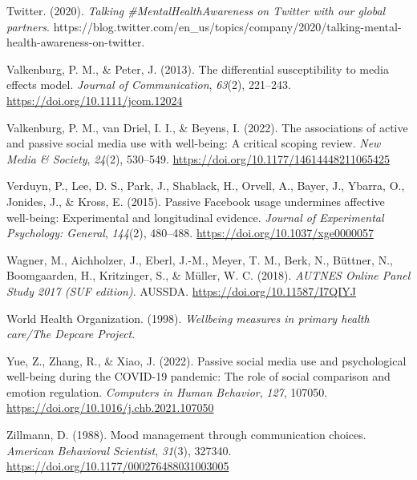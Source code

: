 \documentclass[
  man,mask,floatsintext]{apa7}
\newlength{\cslhangindent}
\newlength{\cslentryspacingunit} %
\newenvironment{CSLReferences}[2] %
 {%
  \setlength{\parindent}{0pt}
  \ifodd #1
  \let\oldpar\par
  \def\par{\hangindent=\cslhangindent\oldpar}
  \fi
  \setlength{\parskip}{#2\cslentryspacingunit}
 }%
 {}
\begin{document}
\begin{CSLReferences}{1}{0}
\leavevmode{}%
Twitter. (2020). \emph{Talking \#{MentalHealthAwareness} on {Twitter} with our global partners}. https://blog.twitter.com/en\_us/topics/company/2020/talking-mental-health-awareness-on-twitter.

\leavevmode{}%
Valkenburg, P. M., \& Peter, J. (2013). The differential susceptibility to media effects model. \emph{Journal of Communication}, \emph{63}(2), 221--243. \url{https://doi.org/10.1111/jcom.12024}

\leavevmode{}%
Valkenburg, P. M., van Driel, I. I., \& Beyens, I. (2022). The associations of active and passive social media use with well-being: {A} critical scoping review. \emph{New Media \& Society}, \emph{24}(2), 530--549. \url{https://doi.org/10.1177/14614448211065425}

\leavevmode{}%
Verduyn, P., Lee, D. S., Park, J., Shablack, H., Orvell, A., Bayer, J., Ybarra, O., Jonides, J., \& Kross, E. (2015). Passive {Facebook} usage undermines affective well-being: {Experimental} and longitudinal evidence. \emph{Journal of Experimental Psychology: General}, \emph{144}(2), 480--488. \url{https://doi.org/10.1037/xge0000057}

\leavevmode{}%
Wagner, M., Aichholzer, J., Eberl, J.-M., Meyer, T. M., Berk, N., Büttner, N., Boomgaarden, H., Kritzinger, S., \& Müller, W. C. (2018). \emph{{AUTNES Online Panel Study} 2017 ({SUF} edition)}. {AUSSDA}. \url{https://doi.org/10.11587/I7QIYJ}

\leavevmode{}%
World Health Organization. (1998). \emph{Wellbeing measures in primary health care/{The Depcare Project}}.

\leavevmode{}%
Yue, Z., Zhang, R., \& Xiao, J. (2022). Passive social media use and psychological well-being during the {COVID-19} pandemic: {The} role of social comparison and emotion regulation. \emph{Computers in Human Behavior}, \emph{127}, 107050. \url{https://doi.org/10.1016/j.chb.2021.107050}

\leavevmode{}%
Zillmann, D. (1988). Mood management through communication choices. \emph{American Behavioral Scientist}, \emph{31}(3), 327340. \url{https://doi.org/10.1177/000276488031003005}

\end{CSLReferences}
\end{document}
